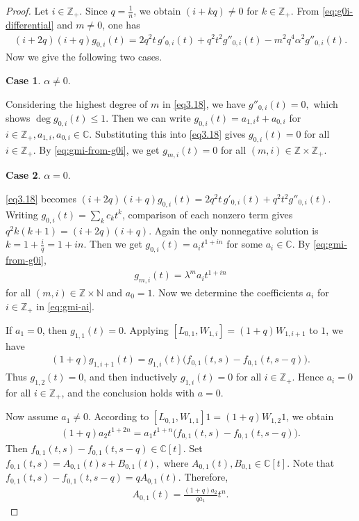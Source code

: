 \documentclass[a4paper]{amsart}
\numberwithin{equation}{section}
\begin{document}
\begin{proof}
Let $i\in\mathbb Z_+$. Since $q=\frac1n$, we obtain $(i+kq) \neq0$ for $k\in\mathbb{Z}_+$. 
From \eqref{eq:g0i-differential} and $m\neq0$, one has
\begin{eqnarray}\label{eq3.18}
(i+2q)(i+q)g_{0,i}(t)
=
2q^2t\,g'_{0,i}(t)
+
q^2t^2g''_{0,i}(t)
-
m^2q^4\alpha^2g''_{0,i}(t).
\end{eqnarray}
 Now we give the following two cases.
 
{\bf Case 1}. $\alpha\neq0$. 

Considering the highest degree of $m$ in \eqref{eq3.18}, we  have 
$
g''_{0,i}(t)=0,
$
which  shows $\deg g_{0,i}(t)\leq1$.  Then we can write $
g_{0,i}(t)=a_{1,i}t+a_{0,i} 
$ for $i\in\mathbb{Z}_+,a_{1,i},a_{0,i}\in\mathbb{C}$. Substituting this into \eqref{eq3.18} gives $g_{0,i}(t)=0$ for all $i\in\mathbb{Z}_+$.
By \eqref{eq:gmi-from-g0i}, we get
$
g_{m,i}(t)=0
$
for all $(m,i)\in\mathbb Z\times\mathbb Z_+$.

{\bf Case 2}. $\alpha=0$. 

\eqref{eq3.18} becomes
$
(i+2q)(i+q)g_{0,i}(t)
=
2q^2t\,g'_{0,i}(t)+q^2t^2g''_{0,i}(t).
$
Writing $g_{0,i}(t)=\sum_k c_kt^k$, comparison of each nonzero term gives
$
q^2k(k+1)=(i+2q)(i+q).
$
Again the only nonnegative solution is $k=1+\frac iq=1+in$. Then we get
$
g_{0,i}(t)=a_i t^{1+in}
$
for some $a_i\in\mathbb C$. By \eqref{eq:gmi-from-g0i},
\begin{align}\label{eq:gmi-ai}
g_{m,i}(t)=\lambda^m a_i t^{1+in} 
\end{align}
for all $(m,i)\in\mathbb{Z}\times\mathbb{N}$ and $a_0=1$.
Now we determine the coefficients $a_i$ for $i\in\mathbb{Z}_+$ in \eqref{eq:gmi-ai}. 


 
If $a_1=0$, then
$g_{1,1}(t)=0$. Applying
$[L_{0,1},W_{1,i}]=(1+q)W_{1,i+1}$
to $1$, we have
\begin{align*}
(1+q)g_{1,i+1}(t)
=
g_{1,i}(t)\bigl(f_{0,1}(t,s)-f_{0,1}(t,s-q)\bigr).
\end{align*}
Thus $g_{1,2}(t)=0$, and then inductively $g_{1,i}(t)=0$ for all
$i\in\mathbb Z_+$. Hence $a_i=0$ for all $i\in \mathbb Z_+$, and the conclusion holds
with $a=0$.

Now assume $a_1\neq0$. 
According to
$[L_{0,1},W_{1,1}]1=(1+q)W_{1,2}1$, we obtain
\begin{align*}
(1+q)a_2t^{1+2n}
=
a_1t^{1+n}\bigl(f_{0,1}(t,s)-f_{0,1}(t,s-q)\bigr).
\end{align*}
Then $f_{0,1}(t,s)-f_{0,1}(t,s-q)\in\mathbb C[t]$. Set
$
f_{0,1}(t,s)=A_{0,1}(t)s+B_{0,1}(t),
$ where $A_{0,1}(t),B_{0,1}\in\mathbb C[t]$.
Note that
$
f_{0,1}(t,s)-f_{0,1}(t,s-q)=qA_{0,1}(t).
$
Therefore,
\begin{align*}
A_{0,1}(t)=\frac{(1+q)a_2}{qa_1}t^n.
\end{align*}


\end{proof}
\end{document}

